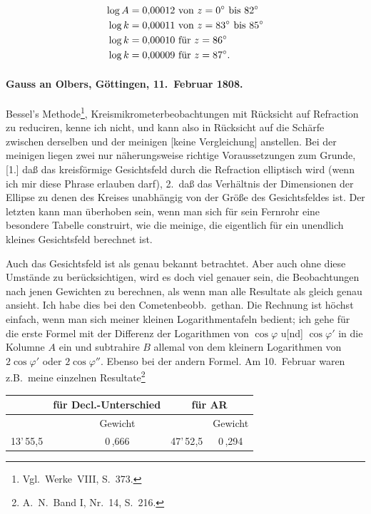 \documentclass[12pt,a4paper]{article}
\newcommand{\degree}{\ensuremath{^\circ}}
\theoremstyle{plain}
\theoremstyle{definition}
\theoremstyle{remark}
\begin{document}
\begin{align}
\log A &= 0{,}00012 \text{ von } z = 0\degree \text{ bis } 82\degree \notag\\
\log k &= 0{,}00011 \text{ von } z = 83\degree \text{ bis } 85\degree \notag\\
\log k &= 0{,}00010 \text{ für } z = 86\degree \notag\\
\log k &= 0{,}00009 \text{ für } z = 87\degree. \notag
\end{align}

\paragraph{Gauss an Olbers, Göttingen, 11.~Februar 1808.}

Bessel's Methode\footnote{Vgl.\ Werke~VIII, S.~373.}, Kreismikrometerbeobachtungen mit Rücksicht auf Refraction zu reduciren, kenne ich nicht, und kann also in Rücksicht auf die Schärfe zwischen derselben und der meinigen [keine Vergleichung] anstellen. Bei der meinigen liegen zwei nur näherungsweise richtige Voraussetzungen zum Grunde, [1.] daß das kreisförmige Gesichtsfeld durch die Refraction elliptisch wird (wenn ich mir diese Phrase erlauben darf), 2.\ daß das Verhältnis der Dimensionen der Ellipse zu denen des Kreises unabhängig von der Größe des Gesichtsfeldes ist. Der letzten kann man überhoben sein, wenn man sich für sein Fernrohr eine besondere Tabelle construirt, wie die meinige, die eigentlich für ein unendlich kleines Gesichtsfeld berechnet ist.

Auch das Gesichtsfeld ist als genau bekannt betrachtet. Aber auch ohne diese Umstände zu berücksichtigen, wird es doch viel genauer sein, die Beobachtungen nach jenen Gewichten zu berechnen, als wenn man alle Resultate als gleich genau ansieht. Ich habe dies bei den Cometenbeobb.\ gethan. Die Rechnung ist höchst einfach, wenn man sich meiner kleinen Logarithmentafeln bedient; ich gehe für die erste Formel mit der Differenz der Logarithmen von $\cos\varphi$ u[nd] $\cos\varphi'$ in die Kolumne $A$ ein und subtrahire $B$ allemal von dem kleinern Logarithmen von $2\cos\varphi'$ oder $2\cos\varphi''$. Ebenso bei der andern Formel. Am 10.\ Februar waren z.B.\ meine einzelnen Resultate\footnote{A.\ N.\ Band I, Nr.\ 14, S.\ 216.}

\begin{center}
\small
\begin{tabular}{c|c|c|c|c}
& \multicolumn{2}{c|}{für Decl.-Unterschied} & \multicolumn{2}{c}{für AR} \\
\hline
& & Gewicht & & Gewicht \\
\hline
13'\,55{,}5 & & 0\,,666 & 47'\,52{,}5 & 0\,,294
\end{tabular}
\end{center}
\end{document}
